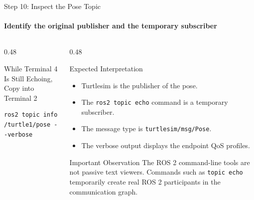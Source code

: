 \begin{frame}[fragile]{Step 10: Inspect the Pose Topic}
\framesubtitle{Identify the original publisher and the temporary subscriber}

\footnotesize

\begin{columns}[T,onlytextwidth]

    \begin{column}{0.48\textwidth}
        \begin{block}{While Terminal 4 Is Still Echoing, Copy into Terminal 2}
\begin{verbatim}
ros2 topic info /turtle1/pose --verbose
\end{verbatim}
        \end{block}
    \end{column}

    \begin{column}{0.48\textwidth}
        \begin{exampleblock}{Expected Interpretation}
            \begin{itemize}
                \setlength{\itemsep}{0.18em}
                \item Turtlesim is the publisher of the pose.
                \item The \texttt{ros2 topic echo} command is a temporary subscriber.
                \item The message type is \texttt{turtlesim/msg/Pose}.
                \item The verbose output displays the endpoint QoS profiles.
            \end{itemize}
        \end{exampleblock}

        \vspace{0.15cm}

        \begin{alertblock}{Important Observation}
            The ROS 2 command-line tools are not passive text viewers.
            Commands such as \texttt{topic echo} temporarily create real ROS 2
            participants in the communication graph.
        \end{alertblock}
    \end{column}

\end{columns}

\end{frame}

